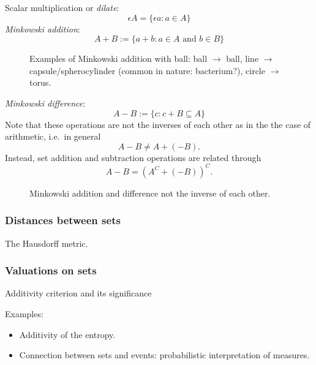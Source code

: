 Scalar multiplication or \emph{dilate}:
\begin{equation}
  \epsilon A = \{\epsilon a : a \in A\}
\end{equation}
\emph{Minkowski addition}:
\begin{equation}
  A + B := \{ a + b : a \in A \textrm{ and } b \in B \}
\end{equation}
\begin{SCfigure}[H]
  \missingfigure[figwidth=0.333\linewidth]{}%
  \missingfigure[figwidth=0.333\linewidth]{}%
  \missingfigure[figwidth=0.333\linewidth]{}
  \caption{Examples of Minkowski addition with ball:
    ball $\to$ ball,
    line $\to$ capsule/spherocylinder (common in nature: bacterium?),
    circle $\to$ torus.
  }
\end{SCfigure}
\emph{Minkowski difference}:
\begin{equation}
  A - B := \{ c : c + B \subseteq A \}
\end{equation}
Note that these operations are not the inverses of each other as in the the case of arithmetic, i.e.\ in general
\begin{equation*}
  A - B \ne A + (-B).
\end{equation*}
Instead, set addition and subtraction operations are related through
\begin{equation*}
  A - B = (A^C + (-B))^C.
\end{equation*}

\begin{SCfigure}[H]
  \caption{Minkowski addition and difference not the inverse of each other.}
\end{SCfigure}

\subsubsection{Distances between sets}
The Hausdorff metric.
\subsubsection{Valuations on sets}
Additivity criterion and its significance

Examples:
\begin{itemize}
\item Additivity of the entropy.
\item Connection between sets and events: probabilistic interpretation of measures.
\end{itemize}

